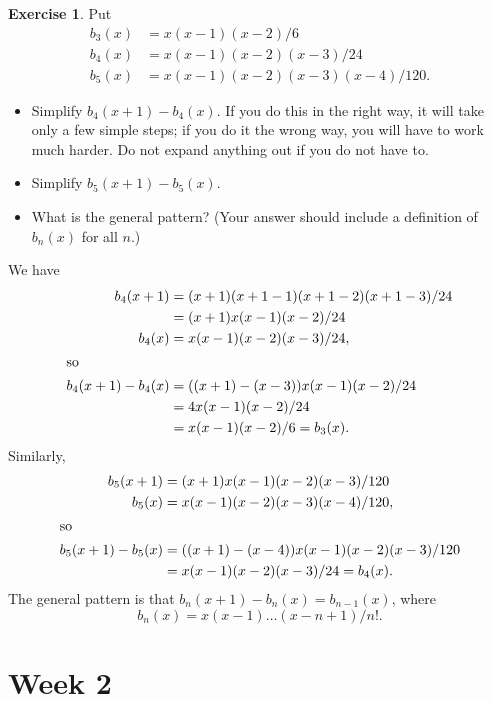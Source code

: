 \documentclass[a4paper]{amsart}
\theoremstyle{definition}
\newtheorem{exercise}{Exercise}[section]
\newenvironment{solution}{{\noindent \bf Solution:}}{}
\begin{document}
\begin{exercise}\label{ex-discrete-derivative}
Put
 \begin{align*}
  b_3(x) &= x(x-1)(x-2)/6 \\
  b_4(x) &= x(x-1)(x-2)(x-3)/24 \\
  b_5(x) &= x(x-1)(x-2)(x-3)(x-4)/120.
 \end{align*}
 \begin{itemize}
  \item Simplify $b_4(x+1)-b_4(x)$.  If you do this in the right way,
   it will take only a few simple steps; if you do it the wrong way,
   you will have to work much harder.  Do not expand anything out if
   you do not have to.
  \item Simplify $b_5(x+1)-b_5(x)$.
  \item What is the general pattern?  (Your answer should include a 
   definition of $b_n(x)$ for all $n$.)
 \end{itemize}
\end{exercise}
\begin{solution}
We have
 \begin{align*}
  b_4(x+1) &= (x+1)(x+1-1)(x+1-2)(x+1-3)/24 \\
           &= {(x+1)}{x(x-1)(x-2)}/24 \\
  b_4(x)   &= {x(x-1)(x-2)}{(x-3)}/24, \\
  \intertext{so}
  b_4(x+1)-b_4(x) &= 
   ({(x+1)}-{(x-3)}){x(x-1)(x-2)}/24 \\
  &= 4{x(x-1)(x-2)}/24 \\
  &= x(x-1)(x-2)/6 = b_3(x).
 \end{align*}
 Similarly,
 \begin{align*}
  b_5(x+1) &= {(x+1)}{x(x-1)(x-2)(x-3)}/120 \\
  b_5(x)   &= {x(x-1)(x-2)(x-3)}{(x-4)}/120, \\
  \intertext{so}
  b_5(x+1)-b_5(x) &= 
   ({(x+1)}-{(x-4)}){x(x-1)(x-2)(x-3)}/120 \\
  &= {x(x-1)(x-2)(x-3)}/24 = b_4(x).
 \end{align*}
 The general pattern is that $b_n(x+1)-b_n(x)=b_{n-1}(x)$, where
 \[ b_n(x) = x(x-1)\ldots(x-n+1)/n!. \]
\end{solution}

\section*{Week 2}
\addtocounter{section}{1}\setcounter{exercise}{0}
\end{document}
